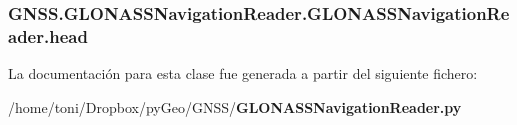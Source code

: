 \subsubsection[{head}]{\setlength{\rightskip}{0pt plus 5cm}G\-N\-S\-S.\-G\-L\-O\-N\-A\-S\-S\-Navigation\-Reader.\-G\-L\-O\-N\-A\-S\-S\-Navigation\-Reader.\-head}\label{classGNSS_1_1GLONASSNavigationReader_1_1GLONASSNavigationReader_a283d09d6d17438d69a2146edb691b051}


La documentación para esta clase fue generada a partir del siguiente fichero\-:\begin{DoxyCompactItemize}
\item 
/home/toni/\-Dropbox/py\-Geo/\-G\-N\-S\-S/{\bf G\-L\-O\-N\-A\-S\-S\-Navigation\-Reader.\-py}\end{DoxyCompactItemize}
